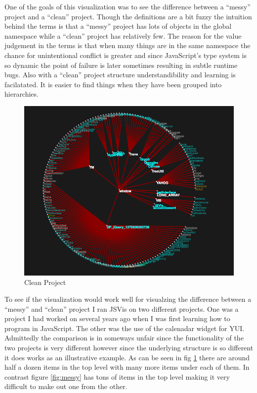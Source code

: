 \documentclass[]{article}
\begin{document}
One of the goals of this visualization was to see the difference between a ``messy'' project and a ``clean'' project. Though the definitions are a bit fuzzy the intuition behind the terms is that a ``messy'' project has lots of objects in the global namespace while a ``clean'' project has relatively few. The reason for the value judgement in the terms is that when many things are in the same namespace the chance for unintentional conflict is greater and since JavaScript's type system is so dynamic the point of failure is later sometimes resulting in subtle runtime bugs. Also with a ``clean'' project structure understandibility and learning is facilatated. It is easier to find things when they have been grouped into hierarchies.

\begin{figure}[h]
  \begin{center}
    \includegraphics[scale=.25]{clean.png}
  \end{center}
  \caption{Clean Project}
  \label{fig:clean}
\end{figure}

To see if the visualization would work well for visualzing the difference between a ``messy'' and ``clean'' project I ran JSVis on two different projects. One was a project I had worked on several years ago when I was first learning how to program in JavaScript. The other was the use of the calenadar widget for YUI. Admittedly the comparison is in someways unfair since the functionality of the two projects is very different however since the underlying structure is so different it does works as an illustrative example. As can be seen in fig \ref{fig:clean} there are around half a dozen items in the top level with many more items under each of them. In contrast figure \ref{fig:messy} has tons of items in the top level making it very difficult to make out one from the other.
\end{document}
